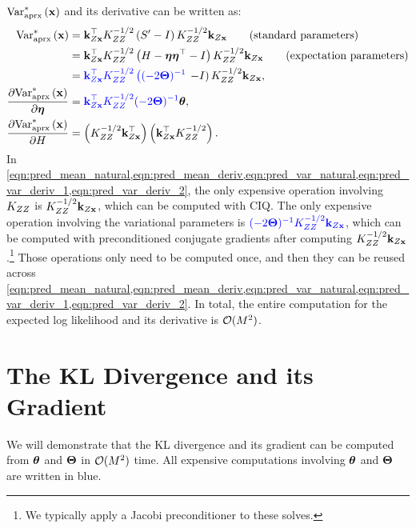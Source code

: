 $\text{Var}^*_\text{aprx} \left( \mathbf{x} \right)$ and its derivative can be written as:
%
\begin{align}
  \text{Var}^*_\text{aprx} \left( \mathbf{x} \right)
  &= \mathbf{k}_{Z \mathbf{x}}^\top K_{ZZ}^{-1/2} \left( S' - I \right) K_{ZZ}^{-1/2} \mathbf{k}_{Z \mathbf{x}}
  \tag{standard parameters} \\
  &= \mathbf{k}_{Z \mathbf{x}}^\top K_{ZZ}^{-1/2} \left( H - \boldsymbol{\eta} \boldsymbol{\eta}^\top - I \right) K_{ZZ}^{-1/2} \mathbf{k}_{Z \mathbf{x}}
  \tag{expectation parameters} \\
  &= {\color{blue} \mathbf{k}_{Z \mathbf{x}}^\top K_{ZZ}^{-1/2} \left((-2 \boldsymbol{\Theta})^{-1} \right.} \left. - I \right) K_{ZZ}^{-1/2} \mathbf{k}_{Z \mathbf{x}}
  \label{eqn:pred_var_natural},
  \\
  \frac{\partial \text{Var}^*_\text{aprx} \left( \mathbf{x} \right)}{\partial \boldsymbol{\eta}}
  &= {\color{blue} \mathbf{k}_{Z \mathbf{x}}^\top K_{ZZ}^{-1/2} (-2 \boldsymbol{\Theta})^{-1}} \boldsymbol{\theta}
  \label{eqn:pred_var_deriv_1},
  \\
  \frac{\partial \text{Var}^*_\text{aprx} \left( \mathbf{x} \right)}{\partial H}
  &= \left( K_{ZZ}^{-1/2} \mathbf{k}_{Z \mathbf{x}}^\top \right) \left( \mathbf{k}_{Z \mathbf{x}}^\top K_{ZZ}^{-1/2} \right)
  \label{eqn:pred_var_deriv_2}.
\end{align}
%
In \cref{eqn:pred_mean_natural,eqn:pred_mean_deriv,eqn:pred_var_natural,eqn:pred_var_deriv_1,eqn:pred_var_deriv_2}, the only expensive operation involving $K_{ZZ}$ is $K_{ZZ}^{-1/2} \mathbf{k}_{Z \mathbf{x}}$, which can be computed with CIQ.
The only expensive operation involving the variational parameters is ${\color{blue} (-2 \boldsymbol{\Theta})^{-1} K_{ZZ}^{-1/2} \mathbf{k}_{Z \mathbf{x}}}$, which can be computed with preconditioned conjugate gradients after computing $K_{ZZ}^{-1/2} \mathbf{k}_{Z \mathbf{x}}$.\footnote{
  We typically apply a Jacobi preconditioner to these solves.
}
Those operations only need to be computed once, and then they can be reused across \cref{eqn:pred_mean_natural,eqn:pred_mean_deriv,eqn:pred_var_natural,eqn:pred_var_deriv_1,eqn:pred_var_deriv_2}.
In total, the entire computation for the expected log likelihood and its derivative is $\bigo{M^2}$.

\section{The KL Divergence and its Gradient}
We will demonstrate that the KL divergence and its gradient can be computed from $\boldsymbol{\theta}$ and $\boldsymbol{\Theta}$ in $\bigo{M^2}$ time.
All expensive computations involving $\boldsymbol{\theta}$ and $\boldsymbol{\Theta}$ are written in {\color{blue} blue}.

